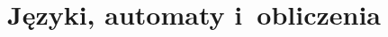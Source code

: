 \documentclass[a4paper,11pt]{article}
\begin{document}
























\section{Języki, automaty i~obliczenia}
\end{document}
